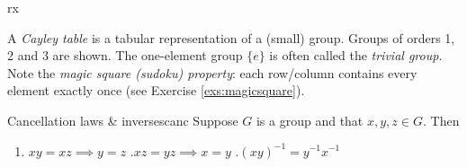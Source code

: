 \begin{examples}{}{rx}
\begin{enumerate}
		\begin{minipage}[t]{0.6\linewidth}\vspace{-9pt}
			\item\label{ex:smallcayley1} A \emph{Cayley table\footnotemark} is a tabular representation of a (small) group. Groups of orders 1, 2 and 3 are shown. The one-element group $\{e\}$ is often called the \emph{trivial group.}\smallbreak
			Note the \emph{magic square (sudoku) property}: each row/column contains every element exactly once (see Exercise \ref{exs:magicsquare}).
		\end{minipage}
		\begin{minipage}[t]{0.39\linewidth}\vspace{-8pt}
			\flushright{}
			\end{minipage}			
		\end{enumerate}
	\end{examples}






\begin{thm}{Cancellation laws \& inverses}{canc}
	Suppose $G$ is a group and that $x,y,z\in G$. Then
	\begin{enumerate}
	  \item $xy=xz\implies y=z$ \qquad{}.\lstsp $xz=yz\implies x=y$ \qquad{}.\lstsp $(xy)^{-1}=y^{-1}x^{-1}$
	\end{enumerate}
\end{thm}

